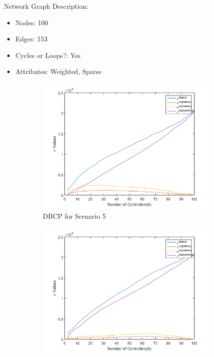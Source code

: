 \documentclass[10pt]{extarticle}
\begin{document}
	Network Graph Description:
	\begin{itemize}
		\item Nodes: 100
		\item Edges: 153
		\item Cycles or Loops?: Yes
		\item Attributes: Weighted, Sparse
	\end{itemize}
	\begin{figure}
		\begin{subfigure}{0.5\linewidth}
			\includegraphics[width=\linewidth]{dbcp_5.png}
			\caption{DBCP for Scenario 5}
			\label{fig:dbcp5}
		\end{subfigure}
		\begin{subfigure}{0.5\linewidth}
			\includegraphics[width=\linewidth]{wdbcp_5.png}

\end{subfigure}
\end{figure}
\end{document}
